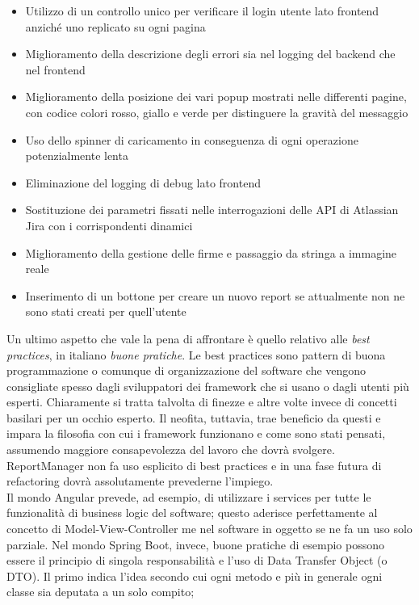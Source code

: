 \begin{itemize}
    \item Utilizzo di un controllo unico per verificare il login utente lato frontend anziché uno replicato su ogni pagina
    \item Miglioramento della descrizione degli errori sia nel logging del backend che nel frontend
    \item Miglioramento della posizione dei vari popup mostrati nelle differenti pagine, con codice colori rosso, giallo e verde per distinguere la gravità del messaggio
    \item Uso dello spinner di caricamento in conseguenza di ogni operazione potenzialmente lenta
    \item Eliminazione del logging di debug lato frontend
    \item Sostituzione dei parametri fissati nelle interrogazioni delle API di Atlassian Jira con i corrispondenti dinamici
    \item Miglioramento della gestione delle firme e passaggio da stringa a immagine reale
    \item Inserimento di un bottone per creare un nuovo report se attualmente non ne sono stati creati per quell'utente
\end{itemize}
Un ultimo aspetto che vale la pena di affrontare è quello relativo alle \emph{best practices}, in italiano \emph{buone pratiche}.
Le best practices sono pattern di buona programmazione o comunque di organizzazione del software che vengono
consigliate spesso dagli sviluppatori dei framework che si usano o dagli utenti più esperti.
Chiaramente si tratta talvolta di finezze e altre volte invece di concetti basilari per un occhio esperto.
Il neofita, tuttavia, trae beneficio da questi e impara la filosofia con cui i framework funzionano e come sono
stati pensati, assumendo maggiore consapevolezza del lavoro che dovrà svolgere.
ReportManager non fa uso esplicito di best practices e in una fase futura di refactoring dovrà assolutamente
prevederne l'impiego.
\\
Il mondo Angular prevede, ad esempio, di utilizzare i services per tutte le funzionalità di business logic del
software; questo aderisce perfettamente al concetto di Model-View-Controller me nel software in oggetto se ne fa
un uso solo parziale.
Nel mondo Spring Boot, invece, buone pratiche di esempio possono essere il principio di singola responsabilità e
l'uso di Data Transfer Object (o DTO).
Il primo indica l'idea secondo cui ogni metodo e più in generale ogni classe sia deputata a un solo compito;
